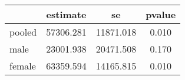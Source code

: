 \begin{table}[htbp]
\begin{tabular}{lccc} \hline \hline
 & estimate  & se  & pvalue  \\  \hline 
pooled & 57306.281 & 11871.018 &     0.010 \\  
male & 23001.938 & 20471.508 &     0.170 \\  
female & 63359.594 & 14165.815 &     0.010 \\  
\hline \hline \end{tabular}
\end{table}
